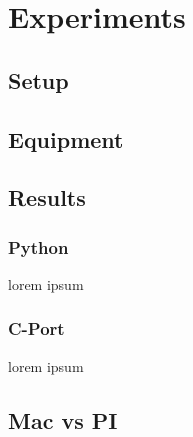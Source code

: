 
\clearpage
\section{Experiments}

\subsection{Setup}

\subsection{Equipment}

\subsection{Results}

\subsubsection{Python}
lorem ipsum

\subsubsection{C-Port}
lorem ipsum

\subsection{Mac vs PI}

